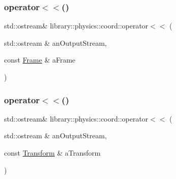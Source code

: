 \subsubsection{\texorpdfstring{operator$<$$<$()}{operator<<()}\hspace{0.1cm}{\footnotesize\ttfamily [4/5]}}
{\footnotesize\ttfamily std\+::ostream\& library\+::physics\+::coord\+::operator$<$$<$ (\begin{DoxyParamCaption}\item[{std\+::ostream \&}]{an\+Output\+Stream,  }\item[{const \hyperlink{classlibrary_1_1physics_1_1coord_1_1_frame}{Frame} \&}]{a\+Frame }\end{DoxyParamCaption})}

\mbox{\label{namespacelibrary_1_1physics_1_1coord_ad6bcffb8bfa72e58047397a14d6785a4}} 
\subsubsection{\texorpdfstring{operator$<$$<$()}{operator<<()}\hspace{0.1cm}{\footnotesize\ttfamily [5/5]}}
{\footnotesize\ttfamily std\+::ostream\& library\+::physics\+::coord\+::operator$<$$<$ (\begin{DoxyParamCaption}\item[{std\+::ostream \&}]{an\+Output\+Stream,  }\item[{const \hyperlink{classlibrary_1_1physics_1_1coord_1_1_transform}{Transform} \&}]{a\+Transform }\end{DoxyParamCaption})}

